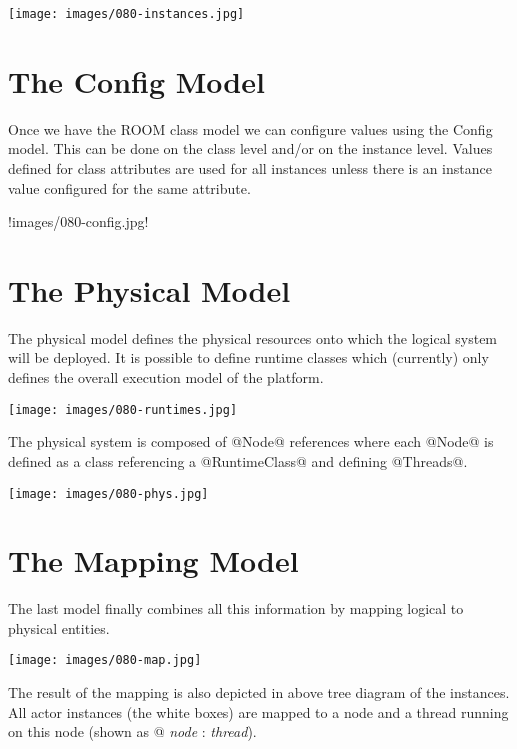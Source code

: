 \texttt{[image: images/080-instances.jpg]}


\section{The Config Model}

Once we have the ROOM class model we can configure values using the Config model. This can be done on the class level and/or on the instance level. Values defined for class attributes are used for all instances unless there is an instance value configured for the same attribute.

!images/080-config.jpg!

\section{The Physical Model}

The physical model defines the physical resources onto which the logical system will be deployed. It is possible to define runtime classes which (currently) only defines the overall execution model of the platform.

\texttt{[image: images/080-runtimes.jpg]}

The physical system is composed of @Node@ references where each @Node@ is defined as a class referencing a @RuntimeClass@ and defining @Threads@.

\texttt{[image: images/080-phys.jpg]}

\section{The Mapping Model}

The last model finally combines all this information by mapping logical to physical entities.

\texttt{[image: images/080-map.jpg]}

The result of the mapping is also depicted in above tree diagram of the instances. All actor instances (the white boxes) are mapped to a node and a thread running on this node (shown as @ \textit{node} : \textit{thread}).
